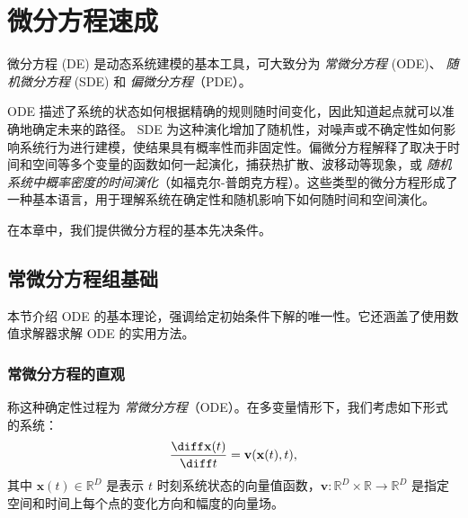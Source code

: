 \chapter{微分方程速成}\label{app:de}

微分方程 (DE) 是动态系统建模的基本工具，可大致分为 \emph{ 常微分方程 } (ODE)、\emph{ 随机微分方程 } (SDE) 和 \emph{偏微分方程}（PDE）。

ODE 描述了系统的状态如何根据精确的规则随时间变化，因此知道起点就可以准确地确定未来的路径。 SDE 为这种演化增加了随机性，对噪声或不确定性如何影响系统行为进行建模，使结果具有概率性而非固定性。偏微分方程解释了取决于时间和空间等多个变量的函数如何一起演化，捕获热扩散、波移动等现象，或 \emph{ 随机系统中概率密度的时间演化}（如福克尔-普朗克方程）。这些类型的微分方程形成了一种基本语言，用于理解系统在确定性和随机影响下如何随时间和空间演化。

在本章中，我们提供微分方程的基本先决条件。


\section{常微分方程组基础}

本节介绍 ODE 的基本理论，强调给定初始条件下解的唯一性。它还涵盖了使用数值求解器求解 ODE 的实用方法。


\subsection{常微分方程的直观}

称这种确定性过程为 \emph{常微分方程}（ODE）。在多变量情形下，我们考虑如下形式的系统：
\begin{equation}\label{eq:general_ode}
    \frac{\diff \mathbf{x}(t)}{\diff t} = \mathbf{v}(\mathbf{x}(t), t),
\end{equation}
其中 $\mathbf{x}(t) \in \mathbb{R}^D$ 是表示 $t$ 时刻系统状态的向量值函数，$\mathbf{v}: \mathbb{R}^D \times \mathbb{R} \to \mathbb{R}^D$ 是指定空间和时间上每个点的变化方向和幅度的向量场。


